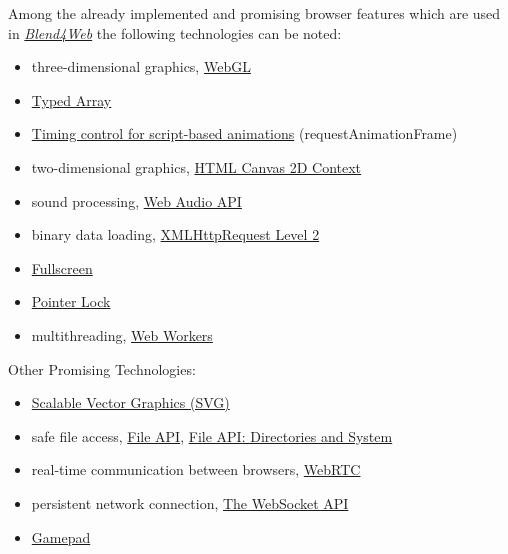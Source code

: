 \documentclass[a4paper,12pt,oneside]{sphinxmanual}
\begin{document}
Among the already implemented and promising browser features which are used in {\hyperref[about:about-product]{\emph{Blend4Web}}} the following technologies can be noted:
\begin{itemize}
\item {} 
three-dimensional graphics, \href{https://www.khronos.org/registry/webgl/specs/latest/}{WebGL}

\item {} 
\href{https://www.khronos.org/registry/typedarray/specs/latest/}{Typed Array}

\item {} 
\href{http://www.w3.org/TR/animation-timing/}{Timing control for script-based animations} (requestAnimationFrame)

\item {} 
two-dimensional graphics, \href{http://www.w3.org/TR/2dcontext/}{HTML Canvas 2D Context}

\item {} 
sound processing, \href{http://www.w3.org/TR/webaudio/}{Web Audio API}

\item {} 
binary data loading, \href{http://www.w3.org/TR/XMLHttpRequest/}{XMLHttpRequest Level 2}

\item {} 
\href{http://dvcs.w3.org/hg/fullscreen/raw-file/tip/Overview.html}{Fullscreen}

\item {} 
\href{http://dvcs.w3.org/hg/pointerlock/raw-file/default/index.html}{Pointer Lock}

\item {} 
multithreading, \href{http://www.w3.org/TR/workers/}{Web Workers}

\end{itemize}

Other Promising Technologies:
\begin{itemize}
\item {} 
\href{http://www.w3.org/TR/SVG/}{Scalable Vector Graphics (SVG)}

\item {} 
safe file access, \href{http://www.w3.org/TR/FileAPI/}{File API}, \href{http://www.w3.org/TR/file-system-api/}{File API: Directories and System}

\item {} 
real-time communication between browsers, \href{http://dev.w3.org/2011/webrtc/editor/webrtc.html}{WebRTC}

\item {} 
persistent network connection, \href{http://www.w3.org/TR/websockets/}{The WebSocket API}

\item {} 
\href{http://dvcs.w3.org/hg/gamepad/raw-file/default/gamepad.html}{Gamepad}

\end{itemize}
\end{document}
